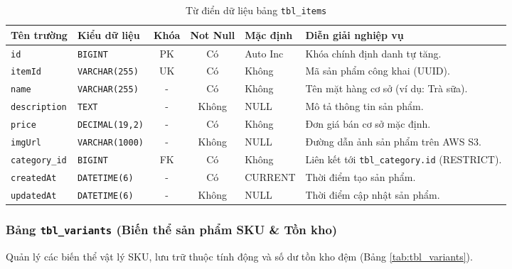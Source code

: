 \begin{table}[htbp]
\centering
\caption{Từ điển dữ liệu bảng \texttt{tbl\_items}}
\label{tab:tbl_items}
\vspace{2mm}
\begin{tabularx}{\textwidth}{|p{2.5cm}|p{2.8cm}|c|c|p{1.8cm}|X|}
\hline
\textbf{Tên trường} & \textbf{Kiểu dữ liệu} & \textbf{Khóa} & \textbf{Not Null} & \textbf{Mặc định} & \textbf{Diễn giải nghiệp vụ} \\ \hline
\texttt{id} & \texttt{BIGINT} & PK & Có & Auto Inc & Khóa chính định danh tự tăng. \\ \hline
\texttt{itemId} & \texttt{VARCHAR(255)} & UK & Có & Không & Mã sản phẩm công khai (UUID). \\ \hline
\texttt{name} & \texttt{VARCHAR(255)} & - & Có & Không & Tên mặt hàng cơ sở (ví dụ: Trà sữa). \\ \hline
\texttt{description} & \texttt{TEXT} & - & Không & NULL & Mô tả thông tin sản phẩm. \\ \hline
\texttt{price} & \texttt{DECIMAL(19,2)} & - & Có & Không & Đơn giá bán cơ sở mặc định. \\ \hline
\texttt{imgUrl} & \texttt{VARCHAR(1000)} & - & Không & NULL & Đường dẫn ảnh sản phẩm trên AWS S3. \\ \hline
\texttt{category\_id} & \texttt{BIGINT} & FK & Có & Không & Liên kết tới \texttt{tbl\_category.id} (RESTRICT). \\ \hline
\texttt{createdAt} & \texttt{DATETIME(6)} & - & Có & CURRENT & Thời điểm tạo sản phẩm. \\ \hline
\texttt{updatedAt} & \texttt{DATETIME(6)} & - & Không & NULL & Thời điểm cập nhật sản phẩm. \\ \hline
\end{tabularx}
\end{table}

\subsubsection{Bảng \texttt{tbl\_variants} (Biến thể sản phẩm SKU \& Tồn kho)}
Quản lý các biến thể vật lý SKU, lưu trữ thuộc tính động và số dư tồn kho đệm (Bảng \ref{tab:tbl_variants}).

